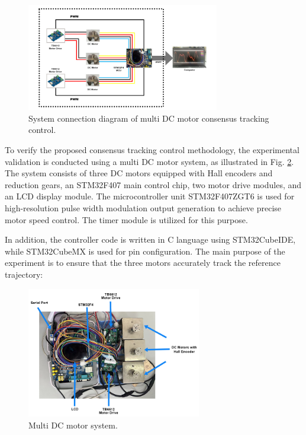 \documentclass[journal,onecolumn]{IEEEtran}
\begin{document}
\begin{figure}[H]
    \centering
    \includegraphics[width=0.75\textwidth]{diagram.jpg}
    \caption{System connection diagram of multi DC motor consensus tracking control.}
    \label{fig:system_diagram} %
\end{figure}

To verify the proposed consensus tracking control methodology, the experimental validation is conducted using a multi DC motor system, as illustrated in Fig. \ref{fig:system}. The system consists of three DC motors equipped with Hall encoders and reduction gears, an STM32F407 main control chip, two motor drive modules, and an LCD display module. The microcontroller unit STM32F407ZGT6 is used for high-resolution pulse width modulation output generation to achieve precise motor speed control. The timer module is utilized for this purpose.

In addition, the controller code is written in C language using STM32CubeIDE, while STM32CubeMX is used for pin configuration. The main purpose of the experiment is to ensure that the three motors accurately track the reference trajectory:

\begin{figure}[H]
    \centering
    \includegraphics[width=0.68\textwidth]{system.jpg}
    \caption{Multi DC motor system.}
    \label{fig:system} %
\end{figure}
\end{document}
